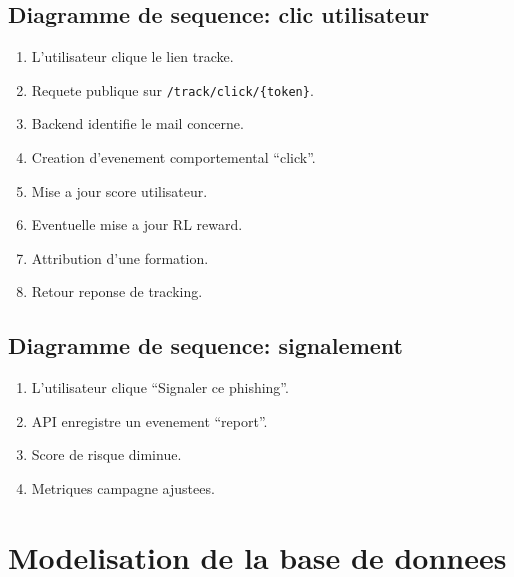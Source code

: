 \documentclass[12pt,a4paper,oneside]{report}
\begin{document}
\subsection{Diagramme de sequence: clic utilisateur}
\begin{enumerate}[leftmargin=1.2cm]
  \item L'utilisateur clique le lien tracke.
  \item Requete publique sur \texttt{/track/click/\{token\}}.
  \item Backend identifie le mail concerne.
  \item Creation d'evenement comportemental ``click''.
  \item Mise a jour score utilisateur.
  \item Eventuelle mise a jour RL reward.
  \item Attribution d'une formation.
  \item Retour reponse de tracking.
\end{enumerate}

\subsection{Diagramme de sequence: signalement}
\begin{enumerate}[leftmargin=1.2cm]
  \item L'utilisateur clique ``Signaler ce phishing''.
  \item API enregistre un evenement ``report''.
  \item Score de risque diminue.
  \item Metriques campagne ajustees.
\end{enumerate}

\section{Modelisation de la base de donnees}
\end{document}
